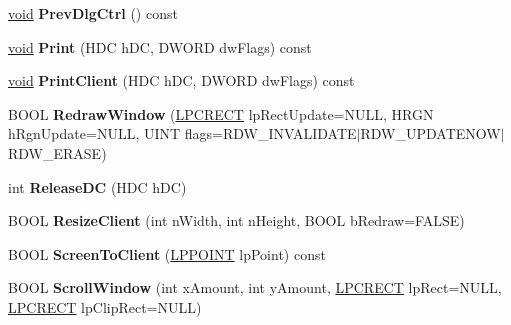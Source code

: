 \begin{DoxyCompactItemize}
\item 
\mbox{\label{class_a_t_l_1_1_c_window_ae7b627f05e91d2576b7cb8c5b38e4776}} 
\hyperlink{interfacevoid}{void} {\bfseries Prev\+Dlg\+Ctrl} () const
\item 
\mbox{\label{class_a_t_l_1_1_c_window_a5d2bdbaab5698ef19c13ed6d06261d21}} 
\hyperlink{interfacevoid}{void} {\bfseries Print} (H\+DC h\+DC, D\+W\+O\+RD dw\+Flags) const
\item 
\mbox{\label{class_a_t_l_1_1_c_window_abcfbfd3176ddc38e0df4e96609bbfcb1}} 
\hyperlink{interfacevoid}{void} {\bfseries Print\+Client} (H\+DC h\+DC, D\+W\+O\+RD dw\+Flags) const
\item 
\mbox{\label{class_a_t_l_1_1_c_window_a7a50ce781306f989288c4fb8c5c9dca4}} 
B\+O\+OL {\bfseries Redraw\+Window} (\hyperlink{structtag_r_e_c_t}{L\+P\+C\+R\+E\+CT} lp\+Rect\+Update=N\+U\+LL, H\+R\+GN h\+Rgn\+Update=N\+U\+LL, U\+I\+NT flags=R\+D\+W\+\_\+\+I\+N\+V\+A\+L\+I\+D\+A\+TE$\vert$R\+D\+W\+\_\+\+U\+P\+D\+A\+T\+E\+N\+OW$\vert$R\+D\+W\+\_\+\+E\+R\+A\+SE)
\item 
\mbox{\label{class_a_t_l_1_1_c_window_aa2837b72a0812c4c2cf6ce851562eeb3}} 
int {\bfseries Release\+DC} (H\+DC h\+DC)
\item 
\mbox{\label{class_a_t_l_1_1_c_window_a23fee6d118eec48b2dfaff16d96b1653}} 
B\+O\+OL {\bfseries Resize\+Client} (int n\+Width, int n\+Height, B\+O\+OL b\+Redraw=F\+A\+L\+SE)
\item 
\mbox{\label{class_a_t_l_1_1_c_window_a592ae6222932951e2daea0c153c176c1}} 
B\+O\+OL {\bfseries Screen\+To\+Client} (\hyperlink{structtag_p_o_i_n_t}{L\+P\+P\+O\+I\+NT} lp\+Point) const
\item 
\mbox{\label{class_a_t_l_1_1_c_window_a88f74c40d35cfb43db022fcccc3875c8}} 
B\+O\+OL {\bfseries Scroll\+Window} (int x\+Amount, int y\+Amount, \hyperlink{structtag_r_e_c_t}{L\+P\+C\+R\+E\+CT} lp\+Rect=N\+U\+LL, \hyperlink{structtag_r_e_c_t}{L\+P\+C\+R\+E\+CT} lp\+Clip\+Rect=N\+U\+LL)
\item 

\end{DoxyCompactItemize}
